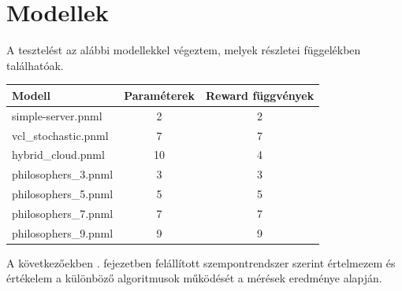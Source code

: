 \section{Modellek}
A tesztelést az alábbi modellekkel végeztem, melyek részletei  függelékben találhatóak.\\
\begin{center}
	\begin{tabular}{lcc}
		\textbf{Modell} & \textbf{Paraméterek} & \textbf{Reward függvények} \\
		\hline
		simple-server.pnml & 2 & 2 \\
		vcl\_stochastic.pnml & 7 & 7 \\
		hybrid\_cloud.pnml & 10 & 4\\
		philosophers\_3.pnml & 3 & 3\\
		philosophers\_5.pnml & 5 & 5\\
		philosophers\_7.pnml & 7 & 7\\
		philosophers\_9.pnml & 9 & 9\\
	\end{tabular}	
\end{center}


A következőekben . fejezetben felállított szempontrendszer szerint értelmezem és értékelem a különböző algoritmusok működését a mérések eredménye alapján.

